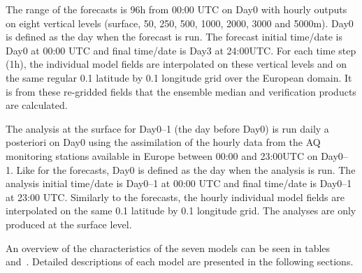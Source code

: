 \documentclass[9pt]{report}
\begin{document}
The range of the forecasts is 96h from 00:00 UTC on Day0 with hourly outputs on eight vertical levels (surface, 50, 250, 500, 1000, 2000, 3000 and 5000m). 
Day0 is defined as the day when the forecast is run. 
The forecast initial time/date is Day0 at 00:00 UTC and final time/date is Day3 at 24:00UTC. 
For each time step (1h), the individual model fields are interpolated on these vertical levels and on the same regular 0.1\textdegree{} latitude by 0.1\textdegree{} longitude grid over the European domain. 
It is from these re-gridded fields that the ensemble median and verification products are calculated.%

The analysis at the surface for Day0–1 (the day before Day0) is run daily a posteriori on Day0 using the assimilation of the hourly data from the AQ monitoring stations available in Europe between 00:00 and 23:00UTC on Day0– 1. 
Like for the forecasts, Day0 is defined as the day when the analysis is run. 
The analysis initial time/date is Day0–1 at 00:00 UTC and final time/date is Day0–1 at 23:00 UTC. 
Similarly to the forecasts, the hourly individual model fields are interpolated on the same 0.1\textdegree{} latitude by 0.1\textdegree{} longitude grid. 
The analyses are only produced at the surface level.%

An overview of the characteristics of the seven models can be seen in tables~ and~.
Detailed descriptions of each model are presented in the following sections.%
\end{document}
